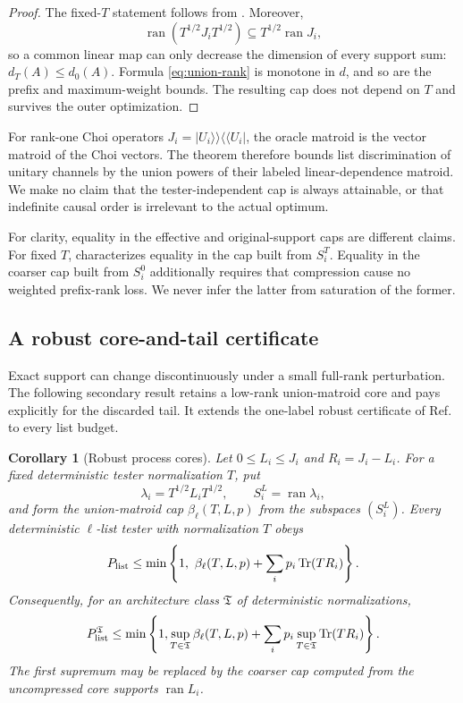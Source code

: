 \documentclass[11pt]{article}
\newtheorem{corollary}[theorem]{Corollary}
\theoremstyle{definition}
\theoremstyle{remark}
\newcommand{\ran}{\operatorname{ran}}
\newcommand{\Tr}{\operatorname{Tr}}
\newcommand{\vket}[1]{\lvert #1\rangle\!\rangle}
\newcommand{\vbra}[1]{\langle\!\langle #1\rvert}
\begin{document}
\begin{proof}
The fixed-$T$ statement follows from .
Moreover,
\[
 \ran(T^{1/2}J_iT^{1/2})\subseteq T^{1/2}\ran J_i,
\]
so a common linear map can only decrease the dimension of every support sum:
$d_T(A)\leq d_0(A)$.  Formula \eqref{eq:union-rank} is monotone in $d$, and
so are the prefix and maximum-weight bounds.  The resulting cap does not
depend on $T$ and survives the outer optimization.
\end{proof}

For rank-one Choi operators $J_i=\vket{U_i}\!\vbra{U_i}$, the oracle matroid
is the vector matroid of the Choi vectors.  The theorem therefore bounds list
discrimination of unitary channels by the union powers of their labeled
linear-dependence matroid.  We make no claim that the tester-independent cap
is always attainable, or that indefinite causal order is irrelevant to the
actual optimum.

For clarity, equality in the effective and original-support caps are different
claims.  For fixed $T$,  characterizes equality in the cap
built from $S_i^T$.  Equality in the coarser cap built from $S_i^0$ additionally
requires that compression cause no weighted prefix-rank loss.  We never infer
the latter from saturation of the former.

\subsection{A robust core-and-tail certificate}

Exact support can change discontinuously under a small full-rank perturbation.
The following secondary result retains a low-rank union-matroid core and pays
explicitly for the discarded tail.  It extends the one-label robust
certificate of Ref.~\cite{eriksson2026matroid} to every list budget.

\begin{corollary}[Robust process cores]\label{cor:robust}
Let $0\leq L_i\leq J_i$ and $R_i=J_i-L_i$.  For a fixed deterministic tester
normalization $T$, put
\[
 \lambda_i=T^{1/2}L_iT^{1/2},\qquad S_i^L=\ran\lambda_i,
\]
and form the union-matroid cap $\beta_\ell(T,L,p)$ from the subspaces
$(S_i^L)$.  Every deterministic $\ell$-list tester with normalization $T$
obeys
\begin{equation}\label{eq:robust-fixed}
 P_{\rm list}\leq
 \min\left\{1,\ \beta_\ell(T,L,p)+\sum_i p_i\Tr(TR_i)\right\}.
\end{equation}
Consequently, for an architecture class $\mathfrak T$ of deterministic
normalizations,
\begin{equation}\label{eq:robust-universal}
 P_{\rm list}^{\mathfrak T}\leq\min\left\{1,
 \sup_{T\in\mathfrak T}\beta_\ell(T,L,p)
 +\sum_i p_i\sup_{T\in\mathfrak T}\Tr(TR_i)\right\}.
\end{equation}
The first supremum may be replaced by the coarser cap computed from the
uncompressed core supports $\ran L_i$.
\end{corollary}
\end{document}
